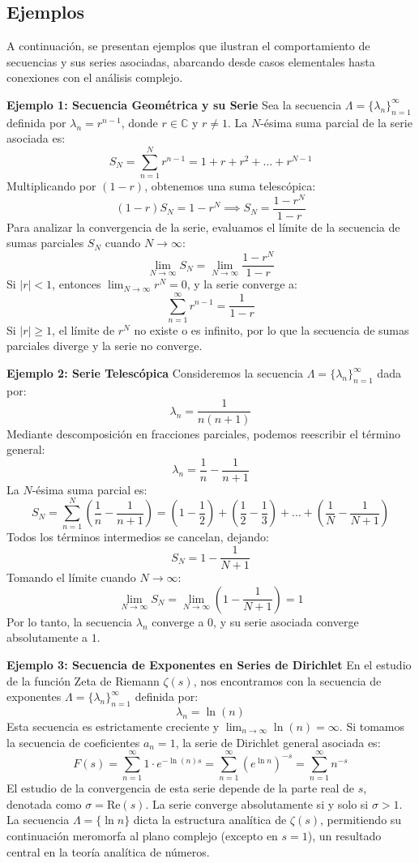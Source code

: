 \documentclass[a4paper]{article}
\begin{document}
\subsection{Ejemplos}

A continuación, se presentan ejemplos que ilustran el comportamiento de secuencias y sus series asociadas, abarcando desde casos elementales hasta conexiones con el análisis complejo.

\textbf{Ejemplo 1: Secuencia Geométrica y su Serie}
Sea la secuencia $\Lambda = \{\lambda_n\}_{n=1}^{\infty}$ definida por $\lambda_n = r^{n-1}$, donde $r \in \mathbb{C}$ y $r \neq 1$.
La $N$-ésima suma parcial de la serie asociada es:
$$ S_N = \sum_{n=1}^{N} r^{n-1} = 1 + r + r^2 + \dots + r^{N-1} $$
Multiplicando por $(1-r)$, obtenemos una suma telescópica:
$$ (1-r)S_N = 1 - r^N \implies S_N = \frac{1 - r^N}{1 - r} $$
Para analizar la convergencia de la serie, evaluamos el límite de la secuencia de sumas parciales $S_N$ cuando $N \to \infty$:
$$ \lim_{N \to \infty} S_N = \lim_{N \to \infty} \frac{1 - r^N}{1 - r} $$
Si $|r| < 1$, entonces $\lim_{N \to \infty} r^N = 0$, y la serie converge a:
$$ \sum_{n=1}^{\infty} r^{n-1} = \frac{1}{1 - r} $$
Si $|r| \geq 1$, el límite de $r^N$ no existe o es infinito, por lo que la secuencia de sumas parciales diverge y la serie no converge.

\textbf{Ejemplo 2: Serie Telescópica}
Consideremos la secuencia $\Lambda = \{\lambda_n\}_{n=1}^{\infty}$ dada por:
$$ \lambda_n = \frac{1}{n(n+1)} $$
Mediante descomposición en fracciones parciales, podemos reescribir el término general:
$$ \lambda_n = \frac{1}{n} - \frac{1}{n+1} $$
La $N$-ésima suma parcial es:
$$ S_N = \sum_{n=1}^{N} \left( \frac{1}{n} - \frac{1}{n+1} \right) = \left(1 - \frac{1}{2}\right) + \left(\frac{1}{2} - \frac{1}{3}\right) + \dots + \left(\frac{1}{N} - \frac{1}{N+1}\right) $$
Todos los términos intermedios se cancelan, dejando:
$$ S_N = 1 - \frac{1}{N+1} $$
Tomando el límite cuando $N \to \infty$:
$$ \lim_{N \to \infty} S_N = \lim_{N \to \infty} \left( 1 - \frac{1}{N+1} \right) = 1 $$
Por lo tanto, la secuencia $\lambda_n$ converge a $0$, y su serie asociada converge absolutamente a $1$.

\textbf{Ejemplo 3: Secuencia de Exponentes en Series de Dirichlet}
En el estudio de la función Zeta de Riemann $\zeta(s)$, nos encontramos con la secuencia de exponentes $\Lambda = \{\lambda_n\}_{n=1}^{\infty}$ definida por:
$$ \lambda_n = \ln(n) $$
Esta secuencia es estrictamente creciente y $\lim_{n \to \infty} \ln(n) = \infty$. Si tomamos la secuencia de coeficientes $a_n = 1$, la serie de Dirichlet general asociada es:
$$ F(s) = \sum_{n=1}^{\infty} 1 \cdot e^{-\ln(n) s} = \sum_{n=1}^{\infty} (e^{\ln n})^{-s} = \sum_{n=1}^{\infty} n^{-s} $$
El estudio de la convergencia de esta serie depende de la parte real de $s$, denotada como $\sigma = \text{Re}(s)$. La serie converge absolutamente si y solo si $\sigma > 1$. La secuencia $\Lambda = \{\ln n\}$ dicta la estructura analítica de $\zeta(s)$, permitiendo su continuación meromorfa al plano complejo (excepto en $s=1$), un resultado central en la teoría analítica de números.
\end{document}
